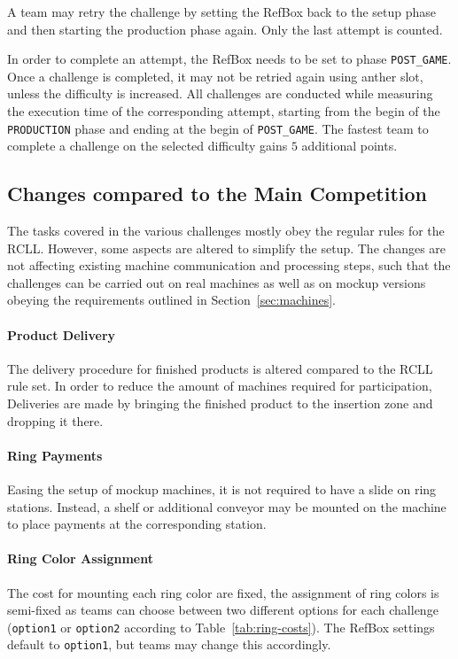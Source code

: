 \documentclass[12pt,twoside]{article}
\newcommand{\refsec}[1]{Section~\ref{#1}}
\newcommand{\reftab}[1]{Table~\ref{#1}}
\begin{document}
A team may retry the challenge by setting the RefBox back to the setup phase
and then starting the production phase again.
Only the last attempt is counted.

In order to complete an attempt, the RefBox needs to be set to phase
\texttt{POST\_GAME}.
Once a challenge is completed, it may not be retried again using anther slot,
unless the difficulty is increased.
All challenges are conducted while measuring the execution time of the
corresponding attempt, starting from the begin of the \texttt{PRODUCTION} phase
and ending at the begin of \texttt{POST\_GAME}.
The fastest team to complete a challenge on the selected difficulty gains $5$
additional points.

\subsection{Changes compared to the Main Competition}
The tasks covered in the various challenges mostly obey the regular rules
for the \ac{RCLL}. However, some aspects are altered to simplify the setup.
The changes are not affecting existing machine communication and processing
steps, such that the challenges can be carried out on real machines as well as
on mockup versions obeying the requirements outlined in \refsec{sec:machines}.

\paragraph{Product Delivery}
The delivery procedure for finished products is altered compared to the
\ac{RCLL} rule set. In order to reduce the amount of machines required
for participation, Deliveries are made by bringing the finished product
to the insertion zone and dropping it there.

\paragraph{Ring Payments}
Easing the setup of mockup machines, it is not required to have a slide
on ring stations. Instead, a shelf or additional conveyor may be mounted on the
machine to place payments at the corresponding station.

\paragraph{Ring Color Assignment}
The cost for mounting each ring color are fixed, the assignment of ring colors
is semi-fixed as teams can choose between two different options for each
challenge (\texttt{option1} or \texttt{option2} according to
\reftab{tab:ring-costs}).
The RefBox settings default to \texttt{option1}, but teams may change this
accordingly.
\end{document}
